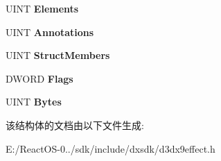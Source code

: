 \begin{DoxyCompactItemize}
U\+I\+NT {\bfseries Elements}
\item 
\mbox{\label{struct___d3_d_x_p_a_r_a_m_e_t_e_r___d_e_s_c_a272c5377ed37cb4a3f5d96c2b1a4e76a}} 
U\+I\+NT {\bfseries Annotations}
\item 
\mbox{\label{struct___d3_d_x_p_a_r_a_m_e_t_e_r___d_e_s_c_a1d315bbe3757ec939a8fbdcdda7cc883}} 
U\+I\+NT {\bfseries Struct\+Members}
\item 
\mbox{\label{struct___d3_d_x_p_a_r_a_m_e_t_e_r___d_e_s_c_af2ab7410123a48171f00ec0ccdd4a030}} 
D\+W\+O\+RD {\bfseries Flags}
\item 
\mbox{\label{struct___d3_d_x_p_a_r_a_m_e_t_e_r___d_e_s_c_ab60d468c0747cb11f995db65839052bf}} 
U\+I\+NT {\bfseries Bytes}
\end{DoxyCompactItemize}


该结构体的文档由以下文件生成\+:\begin{DoxyCompactItemize}
\item 
E\+:/\+React\+O\+S-\/0../sdk/include/dxsdk/d3dx9effect.\+h\end{DoxyCompactItemize}

